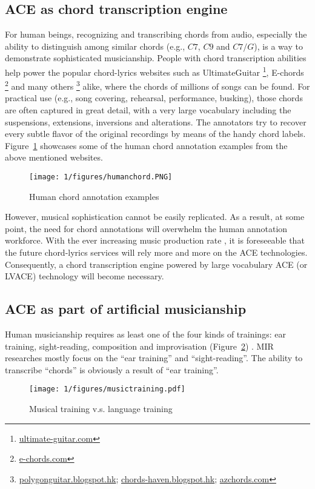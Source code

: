 \subsection{ACE as chord transcription engine}
For human beings, recognizing and transcribing chords from audio, especially the ability to distinguish among similar chords (e.g., $C7$, $C9$ and $C7/G$), is a way to demonstrate sophisticated musicianship. People with chord transcription abilities help power the popular chord-lyrics websites such as UltimateGuitar \footnote{\url{ultimate-guitar.com}}, E-chords \footnote{\url{e-chords.com}} and many others \footnote{\url{polygonguitar.blogspot.hk}; \url{chords-haven.blogspot.hk}; \url{azchords.com}} alike, where the chords of millions of songs can be found. For practical use (e.g., song covering, rehearsal, performance, busking), those chords are often captured in great detail, with a very large vocabulary including the suspensions, extensions, inversions and alterations. The annotators try to recover every subtle flavor of the original recordings by means of the handy chord labels. Figure~\ref{fig:1-humanchord} showcases some of the human chord annotation examples from the above mentioned websites.
\begin{figure}[htb]
\centering
\texttt{[image: 1/figures/humanchord.PNG]}
\caption{Human chord annotation examples}
\label{fig:1-humanchord}
\end{figure}

However, musical sophistication cannot be easily replicated. As a result, at some point, the need for chord annotations will overwhelm the human annotation workforce. With the ever increasing music production rate \cite{globalmusicreport}, it is foreseeable that the future chord-lyrics services will rely more and more on the ACE technologies. Consequently, a chord transcription engine powered by large vocabulary ACE (or LVACE) technology will become necessary.

\subsection{ACE as part of artificial musicianship}
Human musicianship requires as least one of the four kinds of trainings: ear training, sight-reading, composition and improvisation (Figure~\ref{fig:1-musictraining}) . MIR researches mostly focus on the ``ear training'' and ``sight-reading''. The ability to transcribe ``chords'' is obviously a result of ``ear training''.
\begin{figure}[htb]
\centering
\texttt{[image: 1/figures/musictraining.pdf]}
\caption{Musical training v.s. language training}
\label{fig:1-musictraining}
\end{figure}

